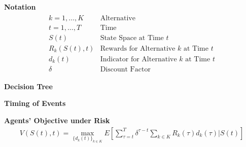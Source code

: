 \begin{frame}
\textbf{Notation}
\begin{align*}\begin{array}{ll}
k = 1, \hdots, K 				&  \text{Alternative}\\
t = 1, \hdots, T	&  \text{Time}\\
S(t)	&  \text{State Space at Time $t$}\\
R_k(S(t),t)  &  \text{Rewards for Alternative $k$ at Time $t$}\\
d_k(t)  &  \text{Indicator for Alternative $k$ at Time $t$}\\
\delta  & \text{Discount Factor}
\end{array}\end{align*}
\end{frame}
\begin{frame}
\begin{center} \textbf{Decision Tree}\\\vspace{0.5cm}
\scalebox{0.8}{}
\end{center}
\end{frame}
\begin{frame}
\begin{center} \textbf{Timing of Events}\vspace{0.9cm}
\scalebox{0.9}{}
\end{center}
\end{frame}
\begin{frame}
\textbf{Agents' Objective under Risk}\vspace{0.3cm}
\begin{align*}
V(S(t),t) = \max_{\{d_k(t)\}_{k \in K}} E\left[ \sum_{\tau = t}^T \delta^{\tau - t} \sum_{k\in K}R_k(\tau)d_k(\tau)\Bigg| S(t)\right]\\
\end{align*}
\end{frame}
